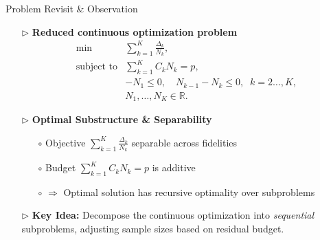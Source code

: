 \documentclass{beamer}
\begin{document}
\begin{frame}{Problem Revisit \& Observation}
\begin{itemize}[leftmargin=5pt] 
\item[$\triangleright$] \textcolor{myblue3}{\bf Reduced continuous optimization problem}
{\footnotesize
        \begin{equation*}\label{eq:Optimization_pb_sample_size}
            \begin{array}{ll}
            \min &\displaystyle\sum_{k=1}^K \frac{\Delta_k}{N_k},\\
            \text{subject to} &\displaystyle\sum\limits_{k=1}^K C_kN_k=p,\\[2pt]
               &\displaystyle -N_1\le 0,\quad \displaystyle N_{k-1}-N_k\le 0, \;\; k=2\ldots,K,\\
               &N_1,\ldots, N_K\in \mathbb{R}.
            \end{array}
        \end{equation*}
        }
\item[$\triangleright$] \textcolor{myblue3}{\bf Optimal Substructure \& Separability}
{\footnotesize
\begin{itemize}[leftmargin=15pt] 
\item[$\circ$] Objective $\sum_{k=1}^K \frac{\Delta_k}{N_k}$ separable across fidelities
    \item[$\circ$]  Budget $\sum_{k=1}^K C_k N_k = p$ is additive
    \item[$\circ$]  $\Rightarrow$ Optimal solution has recursive optimality over subproblems
\end{itemize}
}

\item[$\triangleright$] \textcolor{myblue3}{\bf Key Idea:} 
{\footnotesize
Decompose the continuous optimization into \emph{\textcolor{myblue3}{sequential}} subproblems, adjusting sample sizes based on residual budget.
}
\end{itemize}
\end{frame}
\end{document}
